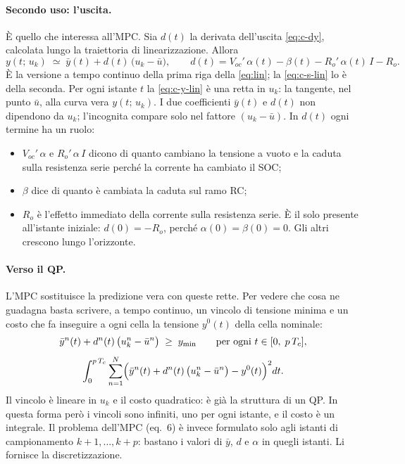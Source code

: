 \documentclass[11pt,a4paper]{article}
\newcommand{\Tc}{T_c}
\begin{document}
\paragraph{Secondo uso: l'uscita.} È quello che interessa all'MPC. Sia $d(t)$
la derivata dell'uscita \eqref{eq:c-dy}, calcolata lungo la traiettoria di
linearizzazione. Allora
\begin{equation}
  y(t;\, u_k) \;\simeq\; \bar y(t) + d(t)\,\bigl(u_k - \bar u\bigr) ,
  \qquad
  d(t) = V_{oc}'\,\alpha(t) - \beta(t) - R_o'\,\alpha(t)\,I - R_o .
  \tag{C11}\label{eq:c-y-lin}
\end{equation}
È la versione a tempo continuo della prima riga della \eqref{eq:lin}; la
\eqref{eq:c-s-lin} lo è della seconda. Per ogni istante $t$ la
\eqref{eq:c-y-lin} è una retta in $u_k$: la tangente, nel punto $\bar u$, alla
curva vera $y(t;\, u_k)$. I due coefficienti $\bar y(t)$ e $d(t)$ non dipendono
da $u_k$; l'incognita compare solo nel fattore $(u_k - \bar u)$. In $d(t)$ ogni
termine ha un ruolo:
\begin{itemize}
  \item $V_{oc}'\,\alpha$ e $R_o'\,\alpha\,I$ dicono di quanto cambiano la
        tensione a vuoto e la caduta sulla resistenza serie perché la corrente
        ha cambiato il SOC;
  \item $\beta$ dice di quanto è cambiata la caduta sul ramo RC;
  \item $R_o$ è l'effetto immediato della corrente sulla resistenza serie. È
        il solo presente all'istante iniziale: $d(0) = -R_o$, perché
        $\alpha(0) = \beta(0) = 0$. Gli altri crescono lungo l'orizzonte.
\end{itemize}

\paragraph{Verso il QP.} L'MPC sostituisce la predizione vera con queste
rette. Per vedere che cosa ne guadagna basta scrivere, a tempo continuo, un
vincolo di tensione minima e un costo che fa inseguire a ogni cella la
tensione $y^0(t)$ della cella nominale:
\begin{gather*}
  \bar y^n(t) + d^n(t)\,\bigl(u^n_k - \bar u^n\bigr) \;\ge\; y_{\min}
  \qquad \text{per ogni } t \in [0,\; p\,\Tc] , \\[4pt]
  \int_0^{p\,\Tc} \sum_{n=1}^{N}
     \Bigl(\bar y^n(t) + d^n(t)\,\bigl(u^n_k - \bar u^n\bigr) - y^0(t)\Bigr)^2 dt .
\end{gather*}
Il vincolo è lineare in $u_k$ e il costo quadratico: è già la struttura di un
QP. In questa forma però i vincoli sono infiniti, uno per ogni istante, e il
costo è un integrale. Il problema dell'MPC (eq.~6) è invece formulato solo agli
istanti di campionamento $k+1, \dots, k+p$: bastano i valori di $\bar y$, $d$
e $\alpha$ in quegli istanti. Li fornisce la discretizzazione.
\end{document}
